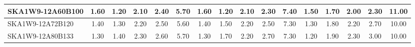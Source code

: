 \begin{table}[H]
{{\begin{tabular}{|lccccc||ccccc||ccccc|}
SKA1W9-12A60B100 & 1.60 \cellcolor{blue!49.50} & 1.20 \cellcolor{red!18.00} & 2.10 \cellcolor{green!26.40} & 2.40 \cellcolor{orange!32.00} & 5.70 \cellcolor{purple!60.00} & 1.60 \cellcolor{blue!49.50} & 1.20 \cellcolor{red!18.00} & 2.10 \cellcolor{green!28.50} & 2.30 \cellcolor{orange!18.00} & 7.40 \cellcolor{purple!60.00} & 1.50 \cellcolor{blue!43.20} & 1.70 \cellcolor{red!36.00} & 2.00 \cellcolor{green!18.00} & 2.30 \cellcolor{orange!23.25} & 11.00 \cellcolor{purple!60.00}\\ \hline 
SKA1W9-12A72B120 & 1.40 \cellcolor{blue!28.50} & 1.30 \cellcolor{red!23.25} & 2.20 \cellcolor{green!34.80} & 2.50 \cellcolor{orange!46.00} & 5.60 \cellcolor{purple!39.00} & 1.40 \cellcolor{blue!28.50} & 1.50 \cellcolor{red!32.00} & 2.20 \cellcolor{green!39.00} & 2.50 \cellcolor{orange!39.00} & 7.30 \cellcolor{purple!49.50} & 1.30 \cellcolor{blue!26.40} & 1.80 \cellcolor{red!42.00} & 2.20 \cellcolor{green!46.00} & 2.70 \cellcolor{orange!44.25} & 10.00 \cellcolor{purple!18.00}\\ \hline 
SKA1W9-12A80B133 & 1.30 \cellcolor{blue!18.00} & 1.40 \cellcolor{red!28.50} & 2.30 \cellcolor{green!43.20} & 2.60 \cellcolor{orange!60.00} & 5.70 \cellcolor{purple!60.00} & 1.30 \cellcolor{blue!18.00} & 1.70 \cellcolor{red!41.33} & 2.20 \cellcolor{green!39.00} & 2.70 \cellcolor{orange!60.00} & 7.30 \cellcolor{purple!49.50} & 1.20 \cellcolor{blue!18.00} & 1.90 \cellcolor{red!48.00} & 2.30 \cellcolor{green!60.00} & 3.00 \cellcolor{orange!60.00} & 10.00 \cellcolor{purple!18.00}\\ \hline 
\end{tabular}}
\vspace{-0.300000cm}
\hspace{1cm} 
}
\end{table}
